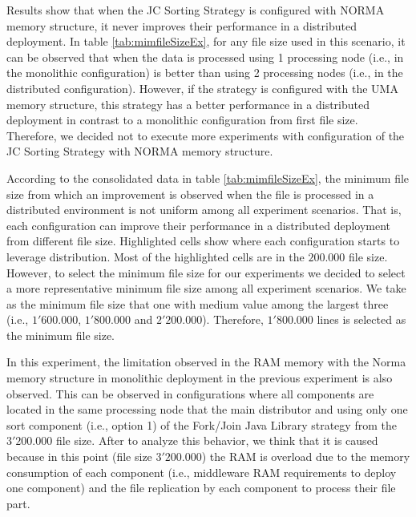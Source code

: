 Results show that when the JC Sorting Strategy is configured with NORMA memory structure, it never improves their performance in a distributed deployment. In table \ref{tab:mimfileSizeEx}, for any file size used in this scenario, it can be observed that when the data is processed using 1 processing node (i.e., in the monolithic configuration) is better than using 2 processing nodes (i.e., in the distributed configuration). However, if the strategy is configured with the UMA memory structure, this strategy has a better performance in a distributed deployment in contrast to a monolithic configuration from first file size. Therefore, we decided not to execute more experiments with configuration of the JC Sorting Strategy with NORMA memory structure. 

According to the consolidated data in table \ref{tab:mimfileSizeEx}, the minimum file size from which an improvement is observed when the file is processed in a distributed environment is not uniform among all experiment scenarios. That is, each configuration can improve their performance in a distributed deployment from different file size. Highlighted cells show where each configuration starts to leverage distribution. Most of the highlighted cells are in the $200.000$ file size. However, to select the minimum file size for our experiments we decided to select a more representative minimum file size among all experiment scenarios. We take as the minimum file size that one with medium value among the largest three (i.e., $1'600.000$, $1'800.000$ and $2'200.000$). Therefore, $1'800.000$ lines is selected as the minimum file size.

In this experiment, the limitation observed in the RAM memory with the Norma memory structure in monolithic deployment in the previous experiment is also observed. This can be observed in configurations where all components are located in the same processing node that the main distributor and using only one sort component (i.e., option 1) of the Fork/Join Java Library strategy from the $3'200.000$ file size. After to analyze this behavior, we think that it is caused because in this point (file size  $3'200.000$) the RAM is overload due to the memory consumption of each component (i.e., middleware RAM requirements to deploy one component) and the file replication by each component to process their file part.

